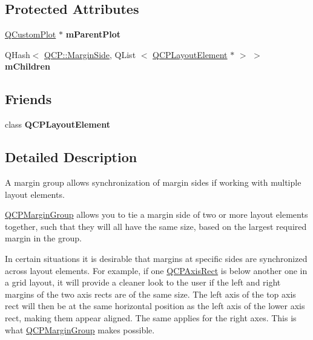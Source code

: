 \subsection*{\-Protected \-Attributes}
\begin{DoxyCompactItemize}
\item 
\hypertarget{classQCPMarginGroup_a23cfa29e3cc0f33a59141b77d8c04edf}{\hyperlink{classQCustomPlot}{\-Q\-Custom\-Plot} $\ast$ {\bfseries m\-Parent\-Plot}}\label{classQCPMarginGroup_a23cfa29e3cc0f33a59141b77d8c04edf}

\item 
\hypertarget{classQCPMarginGroup_a954bc89ff8958b9bb6a4a0d08ed5fc0f}{\-Q\-Hash$<$ \hyperlink{namespaceQCP_a7e487e3e2ccb62ab7771065bab7cae54}{\-Q\-C\-P\-::\-Margin\-Side}, \-Q\-List\*
$<$ \hyperlink{classQCPLayoutElement}{\-Q\-C\-P\-Layout\-Element} $\ast$ $>$ $>$ {\bfseries m\-Children}}\label{classQCPMarginGroup_a954bc89ff8958b9bb6a4a0d08ed5fc0f}

\end{DoxyCompactItemize}
\subsection*{\-Friends}
\begin{DoxyCompactItemize}
\item 
\hypertarget{classQCPMarginGroup_a0790750c7e7f14fdbd960d172655b42b}{class {\bfseries \-Q\-C\-P\-Layout\-Element}}\label{classQCPMarginGroup_a0790750c7e7f14fdbd960d172655b42b}

\end{DoxyCompactItemize}


\subsection{\-Detailed \-Description}
\-A margin group allows synchronization of margin sides if working with multiple layout elements. 

\hyperlink{classQCPMarginGroup}{\-Q\-C\-P\-Margin\-Group} allows you to tie a margin side of two or more layout elements together, such that they will all have the same size, based on the largest required margin in the group.

\par
  \par


\-In certain situations it is desirable that margins at specific sides are synchronized across layout elements. \-For example, if one \hyperlink{classQCPAxisRect}{\-Q\-C\-P\-Axis\-Rect} is below another one in a grid layout, it will provide a cleaner look to the user if the left and right margins of the two axis rects are of the same size. \-The left axis of the top axis rect will then be at the same horizontal position as the left axis of the lower axis rect, making them appear aligned. \-The same applies for the right axes. \-This is what \hyperlink{classQCPMarginGroup}{\-Q\-C\-P\-Margin\-Group} makes possible.

